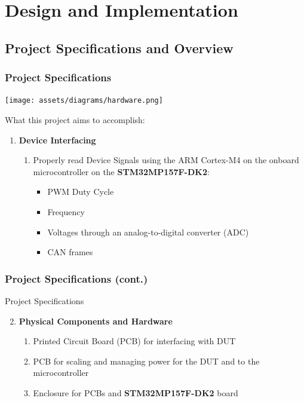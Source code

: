 \documentclass[8pt,compress]{beamer}
\newcommand\LightBold[1]{\textcolor{VSBlueLight}{\textbf{#1}}}
\newcommand\DarkBold[1]{\textcolor{VSBlueDark}{\textbf{#1}}}
\begin{document}

\section{Design and Implementation}
\subsection{Project Specifications and Overview}

\begin{frame}
  \frametitle{Project Specifications}
  \texttt{[image: assets/diagrams/hardware.png]}
  \begin{block}{What this project aims to accomplish:}
    \begin{enumerate}
      \item {\DarkBold{Device Interfacing}}
        \begin{enumerate}
          \item Properly read Device Signals using the ARM Cortex-M4 on the onboard microcontroller on the 
            \LightBold{STM32MP157F-DK2}:
            \begin{itemize}
              \item PWM Duty Cycle
              \item Frequency
              \item Voltages through an analog-to-digital converter (ADC)
              \item CAN frames
            \end{itemize}
        \end{enumerate}
    \end{enumerate}
  \end{block}
\end{frame}

\begin{frame}
  \frametitle{Project Specifications (cont.)}
  \large
  \begin{block}{Project Specifications}
    \large
    \begin{enumerate}
        \setcounter{enumi}{1}
      \item \DarkBold{Physical Components and Hardware}
        \begin{enumerate}
          \large
          \item Printed Circuit Board (PCB) for interfacing with DUT
          \item PCB for scaling and managing power for the DUT and to the microcontroller
          \item Enclosure for PCBs and \LightBold{STM32MP157F-DK2} board
        \end{enumerate}
    \end{enumerate}
  \end{block}
\end{frame}
\end{document}
